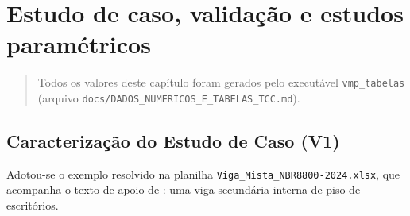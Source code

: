 \chapter{Estudo de caso, validação e estudos paramétricos}\label{cap:4}

\begin{quote}\small
Todos os valores deste capítulo foram gerados pelo executável \texttt{vmp\_tabelas} (arquivo \texttt{docs/DADOS\_NUMERICOS\_E\_TABELAS\_TCC.md}).
\end{quote}

\section{Caracterização do Estudo de Caso (V1)}\label{sec:4.1}
Adotou-se o exemplo resolvido na planilha \texttt{Viga\_Mista\_NBR8800-2024.xlsx}, que acompanha o texto de apoio de : uma viga secundária interna de piso de escritórios.
